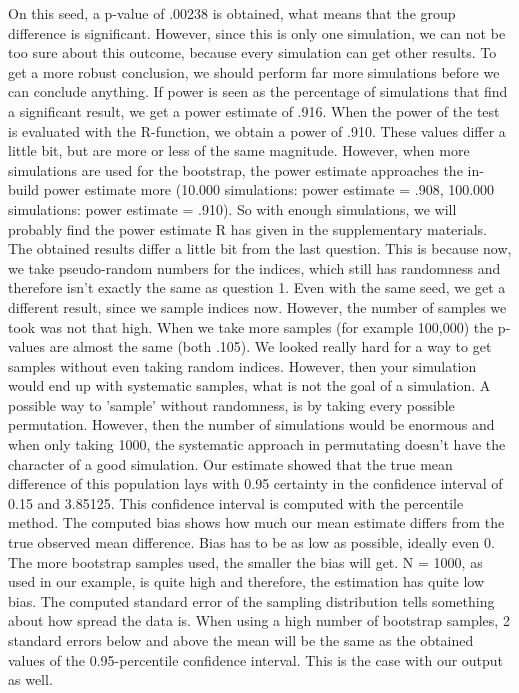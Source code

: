 \documentclass{article}
\begin{document}
On this seed, a p-value of .00238 is obtained, what means that the group difference is significant. However, since this is only one simulation, we can not be too sure about this outcome, because every simulation can get other results. To get a more robust conclusion, we should perform far more simulations before we can conclude anything.
If power is seen as the percentage of simulations that find a significant result, we get a power estimate of .916. When the power of the test is evaluated with the R-function, we obtain a power of .910. These values differ a little bit, but are more or less of the same magnitude. However, when more simulations are used for the bootstrap, the power estimate approaches the in-build power estimate more (10.000 simulations: power estimate = .908, 100.000 simulations: power estimate = .910). So with enough simulations, we will probably find the power estimate R has given in the supplementary materials.
 The obtained results differ a little bit from the last question. This is because now, we take pseudo-random numbers for the indices, which still has randomness and therefore isn't exactly the same as question 1. Even with the same seed, we get a different result, since we sample indices now. However, the number of samples we took was not that high. When we take more samples (for example 100,000) the p-values are almost the same (both .105). We looked really hard for a way to get samples without even taking random indices. However, then your simulation would end up with systematic samples, what is not the goal of a simulation. A possible way to 'sample' without randomness, is by taking every possible permutation. However, then the number of simulations would be enormous and when only taking 1000, the systematic approach in permutating doesn't have the character of a good simulation.
 Our estimate showed that the true mean difference of this population lays with 0.95 certainty in the confidence interval of 0.15 and 3.85125. This confidence interval is computed with the percentile method. The computed bias shows how much our mean estimate differs from the true observed mean difference. Bias has to be as low as possible, ideally even 0. The more bootstrap samples used, the smaller the bias will get. N = 1000, as used in our example, is quite high and therefore, the estimation has quite low bias. The computed standard error of the sampling distribution tells something about how spread the data is. When using a high number of bootstrap samples, 2 standard errors below and above the mean will be the same as the obtained values of the 0.95-percentile confidence interval. This is the case with our output as well.
\end{document}
